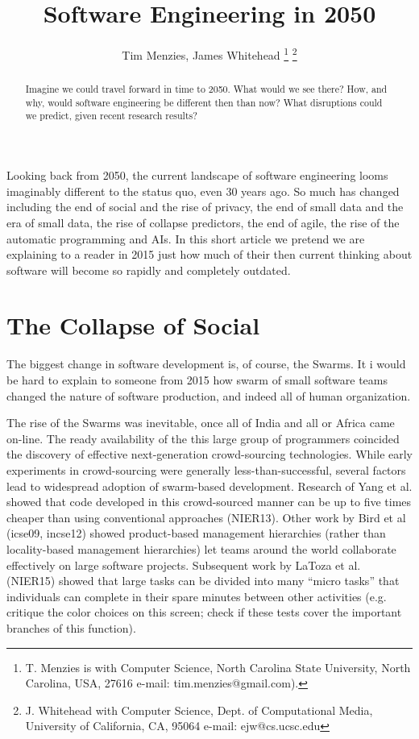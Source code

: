 \documentclass[journal]{IEEEtran}
\begin{document}
 
\title{Software Engineering in 2050}%
\author{Tim Menzies, James Whitehead%
\thanks{T. Menzies is with Computer Science,
North Carolina State University, North Carolina, USA, 27616 e-mail: tim.menzies@gmail.com).}%
\thanks{J. Whitehead with Computer Science, Dept. of Computational Media,
University of California, CA, 95064 e-mail: ejw@cs.ucsc.edu}}%
 
\maketitle

\begin{abstract}
Imagine we could travel forward in time to 2050. What would
we see there? 
How, and why, would software engineering be different then 
than now? What disruptions could we predict,
given recent research results?
\end{abstract}

Looking back from 2050, the current landscape of software engineering
looms imaginably different to the status quo, even 30 years ago. So much has changed including the end of social and the rise of privacy, the end of small data and the era of small data,
the rise of collapse predictors, the end of agile, the rise of the automatic programming and  AIs.
In this short article we pretend we are explaining to a reader in 2015 just how much of their then current thinking about software will become so rapidly and completely outdated.

\section{The Collapse of Social}

The biggest change in
software development is, of course,   the Swarms. It i would be hard to explain to someone from 2015 how swarm of small software teams changed the nature of software production, and indeed all of human organization. 

The rise of the Swarms was inevitable, once all of India and all or Africa came on-line.  The ready availability of the this large group of programmers coincided the discovery of effective next-generation crowd-sourcing technologies.  
While early experiments in crowd-sourcing were generally less-than-successful,
several factors lead to widespread adoption of swarm-based development. 
Research of Yang et al. showed that code developed in this crowd-sourced manner can be up to five times cheaper
than using conventional approaches (NIER13). 
Other work by  Bird et al (icse09, incse12) showed product-based management hierarchies (rather than locality-based management hierarchies) let teams around the world collaborate effectively on large software projects.  Subsequent work by LaToza et al. (NIER15) showed that large tasks can be divided into many ``micro tasks''
that individuals can complete in their spare minutes between other activities
(e.g. critique the color choices on this screen;  check if these tests cover the important branches of this function).  
\end{document}
